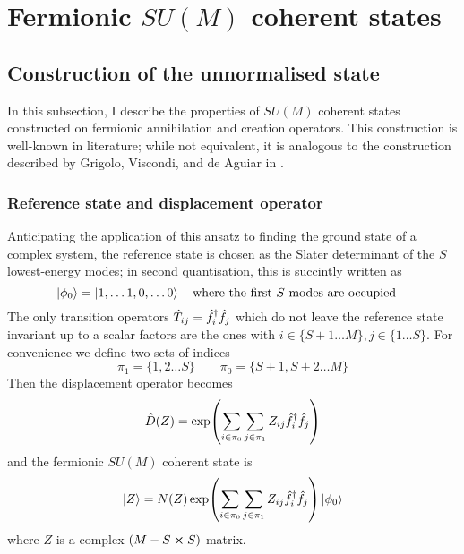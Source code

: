 \section{Fermionic $SU(M)$ coherent states}

\subsection{Construction of the unnormalised state}
In this subsection, I describe the properties of $SU(M)$ coherent states constructed on fermionic annihilation and creation operators. This construction is well-known in literature; while not equivalent, it is analogous to the construction described by Grigolo, Viscondi, and de Aguiar in \cite[Sec. 4]{sampling_algorithm}.

\subsubsection{Reference state and displacement operator}

Anticipating the application of this ansatz to finding the ground state of a complex system, the reference state is chosen as the Slater determinant of the $S$ lowest-energy modes; in second quantisation, this is succintly written as
\begin{equation}
\ket{\phi_0}=\ket{1,\dots 1, 0, \dots 0}\qq{where the first $S$ modes are occupied}
\end{equation}
The only transition operators $\hat{T}_{ij}=\hat{f}^\dagger_i\hat{f}_j$ which do not leave the reference state invariant up to a scalar factors are the ones with $i\in\{S+1\dots M\}, j\in\{1\dots S\}$. For convenience we define two sets of indices
\begin{equation}
\pi_1=\{1, 2\dots S\}\qquad \pi_0=\{S+1, S+2 \dots M\}
\end{equation}
Then the displacement operator becomes
\begin{equation}
\hat{D}(Z)=\exp(\sum_{i\in\pi_0}\sum_{j\in\pi_1}Z_{ij}\hat{f}^\dagger_i\hat{f}_j)
\end{equation}
and the fermionic $SU(M)$ coherent state is
\begin{equation}
\ket{Z}=N(Z)\exp(\sum_{i\in\pi_0}\sum_{j\in\pi_1}Z_{ij}\hat{f}^\dagger_i\hat{f}_j)\ket{\phi_0}
\end{equation}
where $Z$ is a complex $(M-S \cross S)$ matrix.

